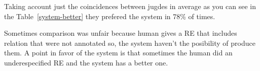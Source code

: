 Taking account just the coincidences between jugdes in average as you can see in the Table~\ref{system-better} they prefered the system in 78\% of times.

Sometimes comparison was unfair because human gives a RE that includes relation that were not annotated so, the system haven't the posibility of produce them. A point in favor of the system is that sometimes the human did an underespecified RE and the system has a better one.\\


